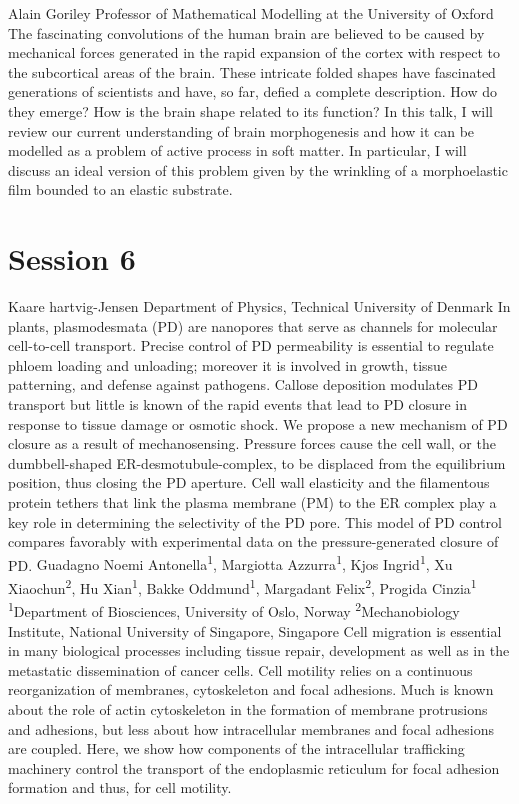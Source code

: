 \documentclass{article}
\begin{document}
{Alain Goriley}
{Professor of Mathematical Modelling at the University of Oxford}
{The fascinating convolutions of the human brain are believed to be caused by
mechanical forces generated in the rapid expansion of the cortex with respect to the
subcortical areas of the brain. These intricate folded shapes have fascinated generations
of scientists and have, so far, defied a complete description. How do they emerge? How is
the brain shape related to its function? In this talk, I will review our current
understanding of brain morphogenesis and how it can be modelled as a problem of active
process in soft matter. In particular, I will discuss an ideal version of this problem
given by the wrinkling of a morphoelastic film bounded to an elastic substrate.}

\newpage
\section*{Session 6}

{Kaare hartvig-Jensen}
{Department of Physics, Technical University of Denmark}
{In plants, plasmodesmata (PD) are nanopores that serve as channels for molecular
cell-to-cell transport. Precise control of PD permeability is essential to regulate phloem
loading and unloading; moreover it is involved in growth, tissue patterning, and defense
against pathogens. Callose deposition modulates PD transport but little is known of the
rapid events that lead to PD closure in response to tissue damage or osmotic shock. We
propose a new mechanism of PD closure as a result of mechanosensing. Pressure forces cause
the cell wall, or the dumbbell-shaped ER-desmotubule-complex, to be displaced from the
equilibrium position, thus closing the PD aperture. Cell wall elasticity and the
filamentous protein tethers that link the plasma membrane (PM) to the ER complex play a
key role in determining the selectivity of the PD pore. This model of PD control compares
favorably with experimental data on the pressure-generated closure of PD.}
{Guadagno Noemi Antonella\textsuperscript{1}, Margiotta Azzurra\textsuperscript{1},
    Kjos Ingrid\textsuperscript{1}, Xu Xiaochun\textsuperscript{2}, Hu Xian\textsuperscript{1},
    Bakke Oddmund\textsuperscript{1}, Margadant Felix\textsuperscript{2}, Progida Cinzia\textsuperscript{1}
}
{
\textsuperscript{1}Department of Biosciences, University of Oslo, Norway\newline
\textsuperscript{2}Mechanobiology Institute, National University of Singapore, Singapore
}
{Cell migration is essential in many biological processes including tissue repair,
development as well as in the metastatic dissemination of cancer cells. Cell motility
relies on a continuous reorganization of membranes, cytoskeleton and focal adhesions. Much
is known about the role of actin cytoskeleton in the formation of membrane protrusions and
adhesions, but less about how intracellular membranes and focal adhesions are coupled.
Here, we show how components of the intracellular trafficking machinery control the
transport of the endoplasmic reticulum for focal adhesion formation and thus, for cell
motility.}
\end{document}
